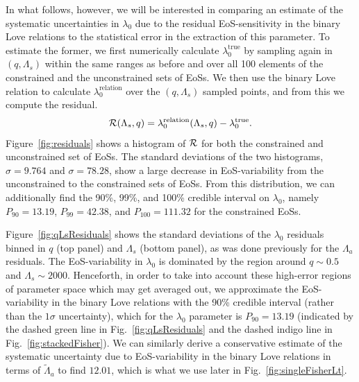 \documentclass[prd,twocolumn,nofootinbib,superscriptaddress,amsmath,amssymb]{revtex4-1}
\begin{document}
In what follows, however, we will be interested in comparing an estimate of the systematic uncertainties in $\lambda_0$ due to the residual EoS-sensitivity in the binary Love relations to the statistical error in the extraction of this parameter. To estimate the former, we first numerically calculate $\lambda_{0}^{\textrm{true}}$ by sampling again in $(q,\Lambda_{s})$ within the same ranges as before and over all 100 elements of the constrained and the unconstrained sets of EoSs. We then use the binary Love relation to calculate $\lambda_0^{\text{relation}}$ over the $(q,\Lambda_{s})$ sampled points, and from this we compute the residual.  
\begin{equation}
{\cal{R}}(\Lambda_{s},q) = \lambda_0^{\text{relation}}(\Lambda_s,q)-\lambda_0^{\text{true}}.
\end{equation}
Figure~\ref{fig:residuals} shows a histogram of ${\cal{R}}$ for both the constrained and unconstrained set of EoSs. The standard deviations of the two histograms, $\sigma=9.764$ and $\sigma=78.28$, show a large decrease in EoS-variability from the unconstrained to the constrained sets of EoSs. From this distribution, we can additionally find the 90\%, 99\%, and 100\% credible interval on $\lambda_0$, namely $P_{90}=13.19$, $P_{99}=42.38$, and $P_{100}=111.32$ for the constrained EoSs.

Figure~\ref{fig:qLsResiduals} shows the standard deviations of the $\lambda_0$ residuals binned in $q$ (top panel) and $\Lambda_{s}$ (bottom panel), as was done previously for the $\Lambda_a$ residuals. The EoS-variability in $\lambda_0$ is dominated by the region around $q \sim 0.5$ and $\Lambda_{s} \sim 2000$. Henceforth, in order to take into account these high-error regions of parameter space which may get averaged out, we approximate the EoS-variability in the binary Love relations with the 90\% credible interval (rather than the $1\sigma$ uncertainty), which for the $\lambda_{0}$ parameter is $P_{90}=13.19$ (indicated by the dashed green line in Fig.~\ref{fig:qLsResiduals} and the dashed indigo line in Fig.~\ref{fig:stackedFisher}). We can similarly derive a conservative estimate of the systematic uncertainty due to EoS-variability in the binary Love relations in terms of $\tilde\Lambda_{a}$ to find $12.01$, which is what we use later in Fig.~\ref{fig:singleFisherLt}.
\end{document}
